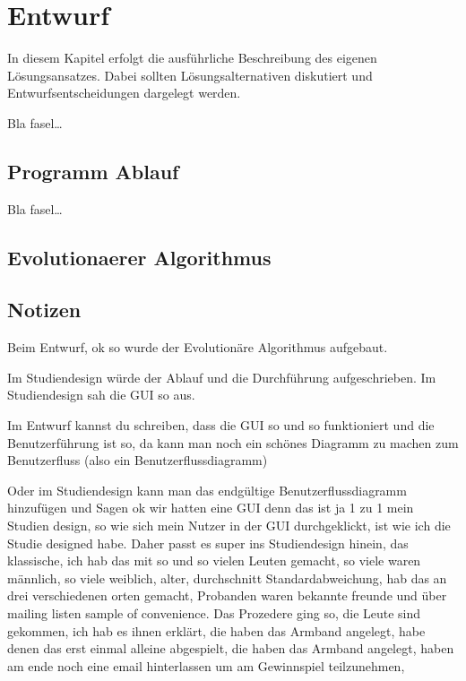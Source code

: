 
\chapter{Entwurf}
\label{ch:Entwurf}
In diesem Kapitel erfolgt die ausf{\"u}hrliche Beschreibung des eigenen
L{\"o}sungsansatzes. Dabei sollten L{\"o}sungsalternativen diskutiert und
Entwurfsentscheidungen dargelegt werden.

Bla fasel\ldots

\section{Programm Ablauf}
\label{ch:Entwurf:sec:Programm Ablauf}

Bla fasel\ldots



\section{Evolutionaerer Algorithmus}
\label{ch:Entwurf:sec:Evolutionaerer Algorithmus}




\section{Notizen}
\label{ch:Entwurf:sec:Notizen}

Beim Entwurf, ok so wurde der Evolution{\"a}re Algorithmus aufgebaut.

Im Studiendesign w{\"u}rde der Ablauf und die Durchf{\"u}hrung aufgeschrieben.
Im Studiendesign sah die GUI so aus. 

Im Entwurf kannst du schreiben, dass die GUI so und so funktioniert und die Benutzerf{\"u}hrung ist so, da kann man noch ein sch{\"o}nes Diagramm zu machen zum Benutzerfluss (also ein Benutzerflussdiagramm) 

Oder im Studiendesign kann man das endg{\"u}ltige Benutzerflussdiagramm hinzuf{\"u}gen und Sagen ok wir hatten eine GUI denn das ist ja 1 zu 1 mein Studien design, so wie sich mein Nutzer in der GUI durchgeklickt, ist wie ich die Studie designed habe. Daher passt es super ins Studiendesign hinein, das klassische, ich hab das mit so und so vielen Leuten gemacht, so viele waren m{\"a}nnlich, so viele weiblich, alter, durchschnitt Standardabweichung, hab das an drei verschiedenen orten gemacht, Probanden waren bekannte freunde und {\"u}ber mailing listen sample of convenience. Das Prozedere ging so, die Leute sind gekommen, ich hab es ihnen erkl{\"a}rt, die haben das Armband angelegt, habe denen das erst einmal alleine abgespielt, die haben das Armband angelegt, haben am ende noch eine email hinterlassen um am Gewinnspiel teilzunehmen,

